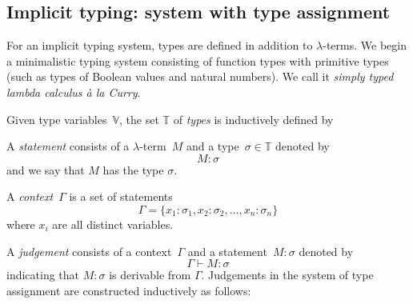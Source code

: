 \subsection{Implicit typing: system with type assignment}
For an implicit typing system, types are defined in addition to $\lambda$-terms.
We begin a minimalistic typing system consisting of function types with primitive
types (such as types of Boolean values and natural numbers). We call it
\emph{simply typed lambda calculus \textit{\`a la} Curry}.
\begin{definition}
  Given type variables~$\mathbb{V}$, the set $\mathbb{T}$ of
  \emph{types} is inductively defined by
  \begin{multicols}{2}
    \begin{prooftree}
    \end{prooftree}
    \begin{prooftree}
    \end{prooftree}
  \end{multicols}
\end{definition}
\begin{definition}
    A \emph{statement} consists of a $\lambda$-term~$M$
      and a type~$\sigma \in \mathbb{T}$ denoted by 
      \[
        M : \sigma
      \]
      and we say that $M$ has the type $\sigma$.

    A \emph{context}~$\Gamma$ is a set of statements 
      \[
        \Gamma = \{x_1 : \sigma_1, x_2 : \sigma_2, \ldots, x_n : \sigma_n\}
      \]
      where $x_i$ are all distinct variables. 
\end{definition}
\begin{definition}
  A \emph{judgement} consists of a context~$\Gamma$ and a statement~$M:\sigma$ denoted by
      \[
        \Gamma \vdash M : \sigma
      \]
  indicating that $M : \sigma$ is derivable from $\Gamma$. Judgements in the
  system of type assignment are constructed inductively as follows:
  \begin{multicols}{2} 
  \begin{prooftree}
  \end{prooftree}
  \begin{prooftree}
  \end{prooftree}
  \begin{prooftree}
  \end{prooftree}
  \end{multicols}
\end{definition}


